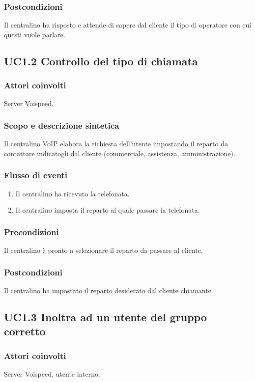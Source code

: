 \subsubsection*{Postcondizioni} Il centralino ha risposto e attende di sapere dal cliente il tipo di operatore con cui questi vuole parlare.

\subsection*{UC1.2 Controllo del tipo di chiamata}
\subsubsection*{Attori coinvolti} Server Voispeed.
\subsubsection*{Scopo e descrizione sintetica}
Il centralino VoIP elabora la richiesta dell'utente impostando il reparto da contattare indicatogli dal cliente (commerciale, assistenza, amministrazione).
\subsubsection*{Flusso di eventi}
\begin{enumerate}
\item Il centralino ha ricevuto la telefonata.
\item Il centralino imposta il reparto al quale passare la telefonata.
\end{enumerate}
\subsubsection*{Precondizioni} Il centralino \` e pronto a selezionare il reparto da passare al cliente.
\subsubsection*{Postcondizioni} Il centralino ha impostato il reparto desiderato dal cliente chiamante.

\subsection*{UC1.3 Inoltra ad un utente del gruppo corretto}
\subsubsection*{Attori coinvolti} Server Voispeed, utente interno.
